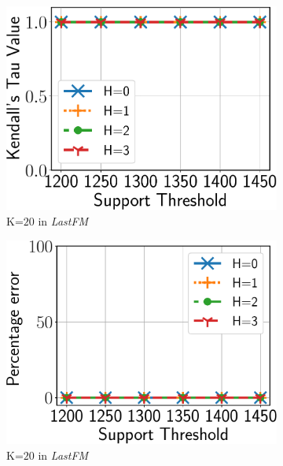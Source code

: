 \begin{figure}
	\vspace{4mm}
	\centering
	\begin{subfigure}[b]{0.25\textwidth}
		\includegraphics[keepaspectratio,scale=0.24, angle=0]{img2/lastfm/lastfm_kt.pdf}
		\caption{\scriptsize {\sf K}=$20$ in {\em LastFM}}
		\label{fig:lastfm_kt}
	\end{subfigure}%
	\begin{subfigure}[b]{0.25\textwidth}
		\includegraphics[keepaspectratio,scale=0.24, angle=0]{img2/lastfm/lastfm_spread.pdf}
		\caption{\scriptsize {\sf K}=$20$ in {\em LastFM}}
		\label{fig:lastfm_error}
	\end{subfigure}%
	\begin{subfigure}[b]{0.25\textwidth}

\end{subfigure}
\end{figure}
